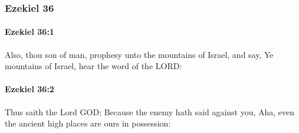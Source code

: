 	\subsubsection{Ezekiel 36} %
		\label{EZEKIEL-36}

		\paragraph{Ezekiel 36:1} %
			\label{EZEKIEL-36-1}

			Also, thou son of man, prophesy unto the mountains of Israel, and say, Ye mountains of Israel, hear the word of the LORD:


		\paragraph{Ezekiel 36:2} %
			\label{EZEKIEL-36-2}

			Thus saith the Lord GOD; Because the enemy hath said against you, Aha, even the ancient high places are ours in possession:

